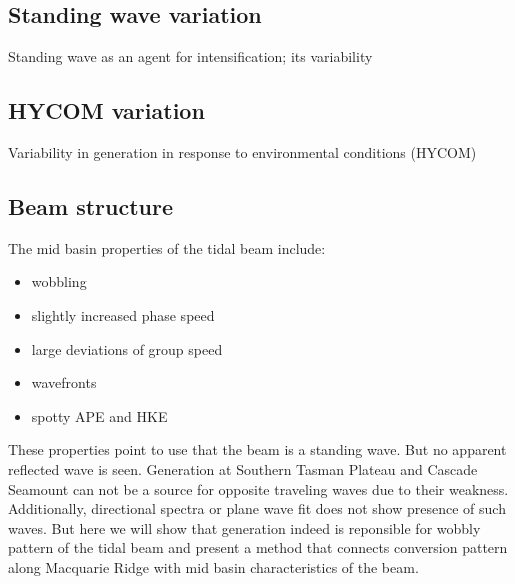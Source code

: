\subsection{Standing wave variation}
Standing wave as an agent for intensification; its variability
\subsection{HYCOM variation}
Variability in generation in response to environmental conditions (HYCOM)
\subsection{Beam structure}
The mid basin properties of the tidal beam include:
\begin{itemize}
\item wobbling
\item slightly increased phase speed
\item large deviations of group speed
\item wavefronts
\item spotty APE and HKE
\end{itemize}
These properties point to use that the beam is a standing wave. But no apparent reflected wave is seen. Generation at Southern Tasman Plateau and Cascade Seamount can not be a source for opposite traveling waves due to their weakness. Additionally, directional spectra or plane wave fit does not show presence of such waves. But here we will show that generation indeed is reponsible for wobbly pattern of the tidal beam and present a method that connects conversion pattern along Macquarie Ridge with mid basin characteristics of the beam.
